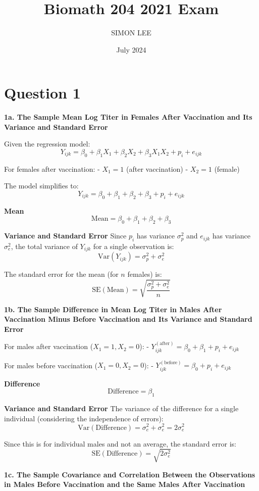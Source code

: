 \documentclass{article}
\title{Biomath 204 2021 Exam}
\author{SIMON LEE}
\date{July 2024}
\begin{document}
\maketitle

\section{Question 1}

\textbf{1a. The Sample Mean Log Titer in Females After Vaccination and Its Variance and Standard Error}

Given the regression model:
\[ Y_{ijk} = \beta_0 + \beta_1 X_1 + \beta_2 X_2 + \beta_3 X_1X_2 + p_i + e_{ijk} \]

For females after vaccination:
- \( X_1 = 1 \) (after vaccination)
- \( X_2 = 1 \) (female)

The model simplifies to:
\[ Y_{ijk} = \beta_0 + \beta_1 + \beta_2 + \beta_3 + p_i + e_{ijk} \]

\textbf{Mean}
\[ \text{Mean} = \beta_0 + \beta_1 + \beta_2 + \beta_3 \]

\textbf{Variance and Standard Error}
Since \( p_i \) has variance \( \sigma_p^2 \) and \( e_{ijk} \) has variance \( \sigma_e^2 \), the total variance of \( Y_{ijk} \) for a single observation is:
\[ \text{Var}(Y_{ijk}) = \sigma_p^2 + \sigma_e^2 \]

The standard error for the mean (for \( n \) females) is:
\[ \text{SE}(\text{Mean}) = \sqrt{\frac{\sigma_p^2 + \sigma_e^2}{n}} \]

\textbf{1b. The Sample Difference in Mean Log Titer in Males After Vaccination Minus Before Vaccination and Its Variance and Standard Error}

For males after vaccination (\( X_1 = 1, X_2 = 0 \)):
- \( Y_{ijk}^{(\text{after})} = \beta_0 + \beta_1 + p_i + e_{ijk} \)

For males before vaccination (\( X_1 = 0, X_2 = 0 \)):
- \( Y_{ijk}^{(\text{before})} = \beta_0 + p_i + e_{ijk} \)

\textbf{Difference}
\[ \text{Difference} = \beta_1 \]

\textbf{Variance and Standard Error}
The variance of the difference for a single individual (considering the independence of errors):
\[ \text{Var}(\text{Difference}) = \sigma_e^2 + \sigma_e^2 = 2\sigma_e^2 \]

Since this is for individual males and not an average, the standard error is:
\[ \text{SE}(\text{Difference}) = \sqrt{2\sigma_e^2} \]

\textbf{1c. The Sample Covariance and Correlation Between the Observations in Males Before Vaccination and the Same Males After Vaccination}
\end{document}
